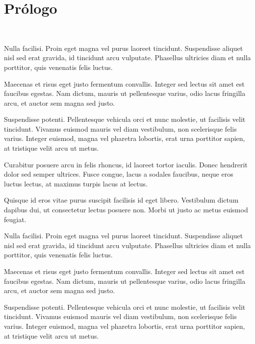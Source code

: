 \chapter[\hspace{1.5pc}Prólogo]{Prólogo}
\setcounter{PrimPag}{\theCurrentPage}

\begin{center}
	\\
	\vspace{20mm}
\end{center}

Nulla facilisi. Proin eget magna vel purus laoreet tincidunt. Suspendisse aliquet nisl sed erat gravida, id tincidunt arcu vulputate. Phasellus ultricies diam et nulla porttitor, quis venenatis felis luctus.

Maecenas et risus eget justo fermentum convallis. Integer sed lectus sit amet est faucibus egestas. Nam dictum, mauris ut pellentesque varius, odio lacus fringilla arcu, et auctor sem magna sed justo.

Suspendisse potenti. Pellentesque vehicula orci et nunc molestie, ut facilisis velit tincidunt. Vivamus euismod mauris vel diam vestibulum, non scelerisque felis varius. Integer euismod, magna vel pharetra lobortis, erat urna porttitor sapien, at tristique velit arcu ut metus.

Curabitur posuere arcu in felis rhoncus, id laoreet tortor iaculis. Donec hendrerit dolor sed semper ultrices. Fusce congue, lacus a sodales faucibus, neque eros luctus lectus, at maximus turpis lacus at lectus.

Quisque id eros vitae purus suscipit facilisis id eget libero. Vestibulum dictum dapibus dui, ut consectetur lectus posuere non. Morbi ut justo ac metus euismod feugiat.

Nulla facilisi. Proin eget magna vel purus laoreet tincidunt. Suspendisse aliquet nisl sed erat gravida, id tincidunt arcu vulputate. Phasellus ultricies diam et nulla porttitor, quis venenatis felis luctus.

Maecenas et risus eget justo fermentum convallis. Integer sed lectus sit amet est faucibus egestas. Nam dictum, mauris ut pellentesque varius, odio lacus fringilla arcu, et auctor sem magna sed justo.

Suspendisse potenti. Pellentesque vehicula orci et nunc molestie, ut facilisis velit tincidunt. Vivamus euismod mauris vel diam vestibulum, non scelerisque felis varius. Integer euismod, magna vel pharetra lobortis, erat urna porttitor sapien, at tristique velit arcu ut metus.

